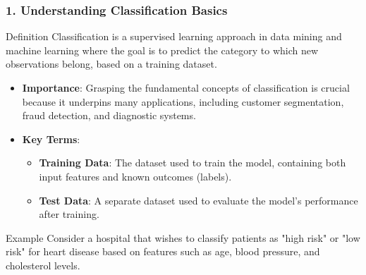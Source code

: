 \documentclass[aspectratio=169]{beamer}
\begin{document}
\begin{frame}[fragile]
    \frametitle{1. Understanding Classification Basics}
    \begin{block}{Definition}
        Classification is a supervised learning approach in data mining and machine learning where the goal is to predict the category to which new observations belong, based on a training dataset.
    \end{block}
    
    \begin{itemize}
        \item \textbf{Importance}: Grasping the fundamental concepts of classification is crucial because it underpins many applications, including customer segmentation, fraud detection, and diagnostic systems.
        \item \textbf{Key Terms}:
        \begin{itemize}
            \item \textbf{Training Data}: The dataset used to train the model, containing both input features and known outcomes (labels).
            \item \textbf{Test Data}: A separate dataset used to evaluate the model's performance after training.
        \end{itemize}
    \end{itemize}

    \begin{block}{Example}
        Consider a hospital that wishes to classify patients as "high risk" or "low risk" for heart disease based on features such as age, blood pressure, and cholesterol levels.
    \end{block}
\end{frame}
\end{document}
